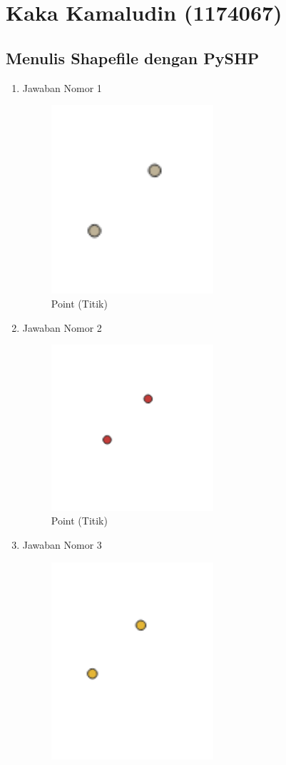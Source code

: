 \section{Kaka Kamaludin (1174067)}
\subsection{Menulis Shapefile dengan PySHP}
\begin{enumerate}
	\item Jawaban Nomor 1
	
	\begin{figure}[H]
		\includegraphics[width=6cm]{figures/Tugas2/1174067/1.png}
		\centering
		\caption{Point (Titik)}
	\end{figure}
	\item Jawaban Nomor 2
	
	\begin{figure}[H]
		\includegraphics[width=6cm]{figures/Tugas2/1174067/2.png}
		\centering
		\caption{Point (Titik)}
	\end{figure}
	\item Jawaban Nomor 3
	
	\begin{figure}[H]
		\includegraphics[width=6cm]{figures/Tugas2/1174067/3.png}

\end{figure}
\end{enumerate}
